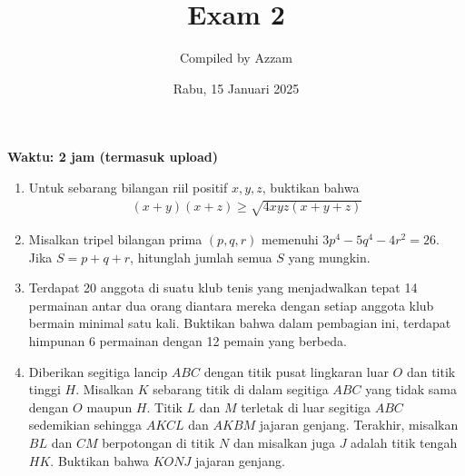 \documentclass[11pt]{scrartcl}
\title{Exam 2}
\author{Compiled by Azzam}
\date{Rabu, 15 Januari 2025}
\begin{document}
\maketitle
\textbf{Waktu: 2 jam (termasuk upload)}

\begin{enumerate}
    \item Untuk sebarang bilangan riil positif $x,y,z$, buktikan bahwa
    \begin{align*}
        (x+y)(x+z) \ge \sqrt{4xyz(x+y+z)}
    \end{align*}

    \item Misalkan tripel bilangan prima $(p,q,r)$ memenuhi $3p^4-5q^4-4r^2=26$. Jika $S = p+q+r$, hitunglah jumlah semua $S$ yang mungkin.

    \item Terdapat 20 anggota di suatu klub tenis yang menjadwalkan tepat 14 permainan antar dua orang diantara mereka dengan setiap anggota klub bermain minimal satu kali. Buktikan bahwa dalam pembagian ini, terdapat himpunan 6 permainan dengan 12 pemain yang berbeda.

    \item Diberikan segitiga lancip $ABC$ dengan titik pusat lingkaran luar $O$ dan titik tinggi $H$. Misalkan $K$ sebarang titik di dalam segitiga $ABC$ yang tidak sama dengan $O$ maupun $H$. Titik $L$ dan $M$ terletak di luar segitiga $ABC$ sedemikian sehingga $AKCL$ dan $AKBM$ jajaran genjang. Terakhir, misalkan $BL$ dan $CM$ berpotongan di titik $N$ dan misalkan juga $J$ adalah titik tengah $HK$. Buktikan bahwa $KONJ$ jajaran genjang.

\end{enumerate}
\end{document}
